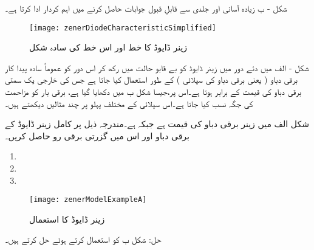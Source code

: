 شکل  - ب زیادہ آسانی اور جلدی سے قابلِ قبول جوابات حاصل کرنے میں اہم کردار ادا کرتا ہے۔
\begin{figure}
\centering
\texttt{[image: zenerDiodeCharacteristicSimplified]}
\caption{زینر ڈایوڈ کا خط اور اس خط کی سادہ شکل }
\label{شکل_زینر_خط_کی_سادہ_شکل}
\end{figure}
شکل  - الف میں دئے دور میں زینر ڈایوڈ کو بے قابو حالت میں رکھ کر اس دور کو عموماً سادہ پیدا کار برقی دباو ( یعنی برقی دباو کی سپلائی ) کے طور استعمال کیا جاتا ہے جس کی خارجی یک سمتی برقی دباو کی قیمت   کے برابر ہوتا ہے۔اس پر،جیسا شکل   ب میں دکھایا گیا ہے، برقی بار کو مزاحمت  کی جگہ نسب کیا جاتا ہے۔اس سپلائی کے مختلف پہلو پر چند مثالیں دیکھتے ہیں۔

 
شکل  الف میں زینر برقی دباو   کی قیمت  ہے جبکہ   ہے۔مندرجہ ذیل   پر کامل زینر ڈایوڈ کے برقی دباو اور اس میں گزرتی برقی رو حاصل کریں۔
\begin{enumerate}
\item
{}
\item
{}
\item
{}
\end{enumerate}
\begin{figure}
\centering
\texttt{[image: zenerModelExampleA]}
\caption{زینر ڈایوڈ کا استعمال}
\label{شکل_زینر_ڈایوڈ_کا_استعمال}
\end{figure}
حل:	شکل     ب کو استعمال کرتے ہوئے حل کرتے ہیں۔
